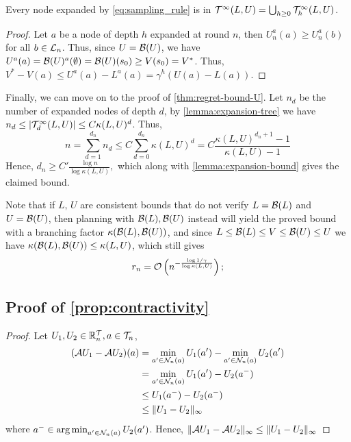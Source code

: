 \documentclass{article}
\begin{document}
\begin{lemma}
\label{lemma:expansion-tree}
Every node expanded by \eqref{eq:sampling_rule} is in $\mathcal{T}^\infty(L,U) = \bigcup_{h\geq 0} \mathcal{T}^\infty_h(L,U)$.
\end{lemma}
\begin{proof}
Let $a$ be a node of depth $h$ expanded at round $n$, then $U^a_n(a) \geq U^a_n(b)$ for all $b\in\mathcal{L}_n$. Thus, since $U = \mathcal{B}(U)$, we have $U^a(a) = \mathcal{B}(U)^a(\emptyset) = \mathcal{B}(U)(s_0) \geq V(s_0) = V^*$. Thus, $V^* - V(a) \leq U^a(a) - L^a(a) = \gamma^h(U(a) - L(a))$.
\end{proof}

Finally, we can move on to the proof of \autoref{thm:regret-bound-U}.
Let $n_d$ be the number of expanded nodes of depth $d$, by \autoref{lemma:expansion-tree} we have $n_d \leq |\mathcal{T}^\infty_d(L,U)| \leq C\kappa(L,U)^d$. Thus, 
\[n = \sum_{d=1}^{d_n} n_d \leq C\sum_{d=0}^{d_n} \kappa(L,U)^d = C\frac{\kappa(L,U)^{d_n+1}-1}{\kappa(L,U)-1}\]
Hence, $d_n \geq C'\frac{\log n}{\log\kappa(L,U)},$ which along with \autoref{lemma:expansion-bound} gives the claimed bound.

Note that if $L,\,U$ are consistent bounds that do not verify $L = \mathcal{B}(L)$ and $U=\mathcal{B}(U)$, then planning with $\mathcal{B}(L),\mathcal{B}(U)$ instead will yield the proved bound with a branching factor $\kappa(\mathcal{B}(L),\mathcal{B}(U))$, and since $L\leq\mathcal{B}(L)\leq V\leq \mathcal{B}(U)\leq U$ we have $\kappa(\mathcal{B}(L),\mathcal{B}(U)) \leq \kappa(L,U)$, which still gives \begin{align*}
r_n = \mathcal{O}\left(n^{-\frac{\log 1/\gamma}{\log \kappa(L,U)}}\right);
\end{align*}

\subsection{Proof of \autoref{prop:contractivity}}
\begin{proof}
Let $U_1, U_2\in \mathbb{R}^{\mathcal{T}}_n, a\in\mathcal{T}_n$,
\begin{align*}
    (\mathcal{A} U_1 - \mathcal{A} U_2)(a) &= \min_{a'\in\mathcal{N}_n(a)} U_1(a') - \min_{a'\in\mathcal{N}_n(a)} U_2(a') \\
    &= \min_{a'\in\mathcal{N}_n(a)} U_1(a') - U_2(a^-) \\
    &\leq U_1(a^-) - U_2(a^-) \\
    &\leq \|U_1 - U_2\|_\infty
\end{align*}
where $a^-\in \operatorname*{arg\,min}_{a'\in\mathcal{N}_n(a)} U_2(a')$. 
Hence, $\|\mathcal{A} U_1 - \mathcal{A} U_2\|_\infty \leq \|U_1 - U_2\|_\infty$
\end{proof}
\end{document}
